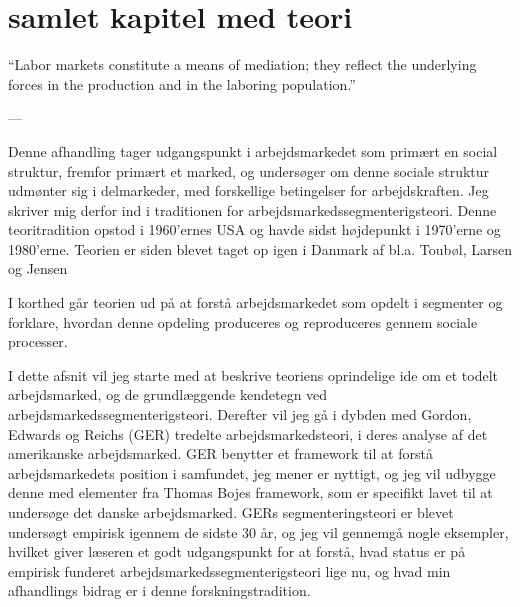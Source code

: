 

\chapter{samlet kapitel med teori \label{AST}}



\vspace{20pt} \epigraphfontsize{\small\itshape}
\epigraphfontsize{\small\itshape}
\epigraph{“Labor markets constitute a means of mediation; they reflect the underlying forces in the production and in the laboring population.”}{--- \textup{\parencite[177]{Edwards1979}}}


Denne afhandling tager udgangspunkt i arbejdsmarkedet som primært en social struktur, fremfor primært et marked, og undersøger om denne sociale struktur udmønter sig i delmarkeder, med forskellige betingelser for arbejdskraften. Jeg skriver mig derfor ind i traditionen for arbejdsmarkedssegmenterigsteori.
Denne teoritradition opstod i 1960'ernes USA og havde sidst højdepunkt i 1970'erne og 1980'erne. Teorien er siden blevet taget op igen i Danmark af bl.a. Toubøl, Larsen og Jensen \textcite{Touboel2013} %

I korthed går teorien ud på at forstå arbejdsmarkedet som opdelt i segmenter og forklare, hvordan denne opdeling produceres og reproduceres gennem sociale processer.


I dette afsnit vil jeg starte med at beskrive teoriens oprindelige ide om et todelt arbejdsmarked, og de grundlæggende kendetegn ved arbejdsmarkedssegmenterigsteori. Derefter vil jeg gå i dybden med Gordon, Edwards og Reichs (GER) tredelte arbejdsmarkedsteori, i deres analyse af det amerikanske arbejdsmarked. GER benytter et framework til at forstå arbejdsmarkedets position i samfundet, jeg mener er nyttigt, og jeg vil udbygge denne med elementer fra Thomas Bojes framework, som er specifikt lavet til at undersøge det danske arbejdsmarked.
GERs segmenteringsteori er blevet undersøgt empirisk igennem de sidste 30 år, og jeg vil gennemgå nogle eksempler,  hvilket giver læseren et godt udgangspunkt for at forstå, hvad status er på empirisk funderet arbejdsmarkedssegmenterigsteori lige nu, og hvad min afhandlings bidrag er i denne forskningstradition. 

